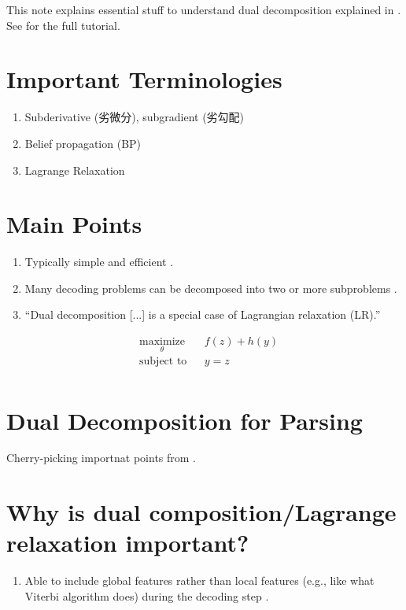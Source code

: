\documentclass[11pt]{article}
\begin{document}
This note explains essential stuff to understand dual decomposition explained in \cite{pfi_dual_decomposition}. 
See \cite{Rush_2012_tutorial} for the full tutorial.

\section{Important Terminologies}
\begin{enumerate}
 \item Subderivative (劣微分), subgradient (劣勾配)
 \item Belief propagation (BP)
 \item Lagrange Relaxation
\end{enumerate}

\section{Main Points}
\begin{enumerate}
 \item Typically simple and efficient \cite{Rush_2012_tutorial}.
 \item Many decoding problems can be decomposed into two or more subproblems \cite{Rush_2012_tutorial}.
 \item ``Dual decomposition [...] is a special case of Lagrangian relaxation (LR).'' \cite{Rush_2012_tutorial}
\end{enumerate}

\begin{equation*}
\begin{aligned}
& \underset{\theta}{\text{maximize}}
& & f(z) + h(y) \\
& \text{subject to}
& & y = z \\
\end{aligned}
\end{equation*}

\section{Dual Decomposition for Parsing}
Cherry-picking importnat points from \cite{Rush_2012_tutorial}.

\section{Why is dual composition/Lagrange relaxation important?}
\begin{enumerate}
 \item Able to include global features rather than local features (e.g., like what Viterbi algorithm does) during the decoding step \cite{pfi_dual_decomposition}. 
\end{enumerate}



\end{document}
